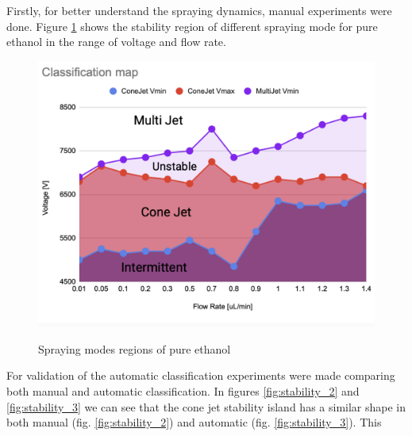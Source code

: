     Firstly, for better understand the spraying dynamics, manual experiments were done.
    Figure \ref{fig:stability_1} shows the stability region of different spraying mode for pure ethanol in the range of voltage and flow rate.

    \begin{figure}[H]
        \center
        \includegraphics[width=12cm]{Figuras/regions.png}
        \label{fig:stability_1}
        \caption{Spraying modes regions of pure ethanol}
    \end{figure}


    For validation of the automatic classification experiments were made comparing both manual and automatic classification.
    In figures \ref{fig:stability_2} and \ref{fig:stability_3} we can see that the cone jet stability island has a similar shape in both manual (fig. \ref{fig:stability_2}) and automatic (fig. \ref{fig:stability_3}). This 

